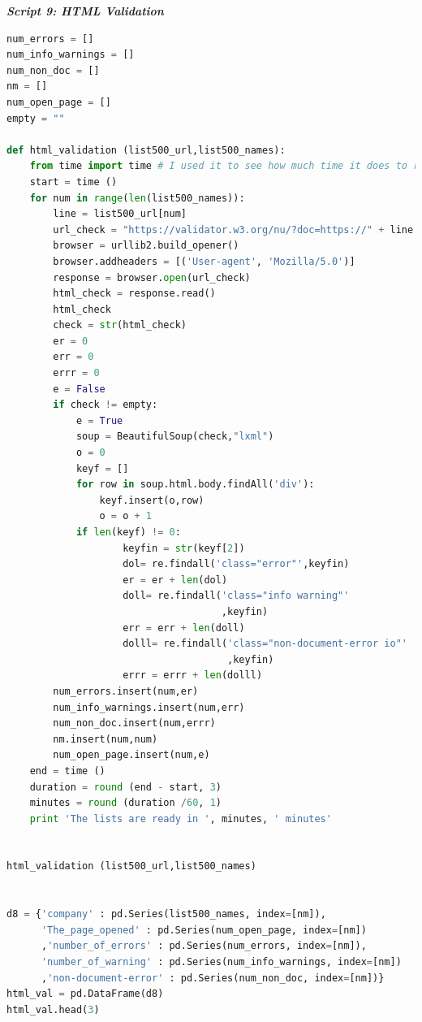 \documentclass{article}
\begin{document}
\begin{center}
\textit{\textbf{Script 9: HTML Validation}}\label{p9}
\end{center}
\begin{lstlisting}[language=Python]
num_errors = []
num_info_warnings = []
num_non_doc = [] 
nm = []
num_open_page = []
empty = ""
 
def html_validation (list500_url,list500_names):
    from time import time # I used it to see how much time it does to run the function
    start = time ()
    for num in range(len(list500_names)):
        line = list500_url[num] 
        url_check = "https://validator.w3.org/nu/?doc=https://" + line
        browser = urllib2.build_opener()
        browser.addheaders = [('User-agent', 'Mozilla/5.0')]
        response = browser.open(url_check)
        html_check = response.read()
        html_check
        check = str(html_check)
        er = 0
        err = 0
        errr = 0
        e = False
        if check != empty:
            e = True
            soup = BeautifulSoup(check,"lxml")
            o = 0
            keyf = []
            for row in soup.html.body.findAll('div'):
                keyf.insert(o,row)
                o = o + 1                    
            if len(keyf) != 0:       
                    keyfin = str(keyf[2])                     
                    dol= re.findall('class="error"',keyfin)            
                    er = er + len(dol)
                    doll= re.findall('class="info warning"'
                                     ,keyfin)            
                    err = err + len(doll)
                    dolll= re.findall('class="non-document-error io"'
                                      ,keyfin)            
                    errr = errr + len(dolll)
        num_errors.insert(num,er)
        num_info_warnings.insert(num,err)
        num_non_doc.insert(num,errr)  
        nm.insert(num,num) 
        num_open_page.insert(num,e)
    end = time ()
    duration = round (end - start, 3)
    minutes = round (duration /60, 1)
    print 'The lists are ready in ', minutes, ' minutes'
 

html_validation (list500_url,list500_names)
 

d8 = {'company' : pd.Series(list500_names, index=[nm]),
      'The_page_opened' : pd.Series(num_open_page, index=[nm])
      ,'number_of_errors' : pd.Series(num_errors, index=[nm]),
      'number_of_warning' : pd.Series(num_info_warnings, index=[nm])
      ,'non-document-error' : pd.Series(num_non_doc, index=[nm])}
html_val = pd.DataFrame(d8)    
html_val.head(3) 
\end{lstlisting}
\end{document}
